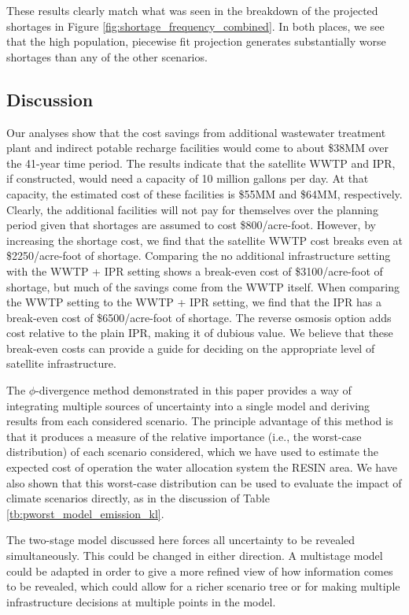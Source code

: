 \documentclass[11pt]{article}
\theoremstyle{plain}
\theoremstyle{definition}
\theoremstyle{remark}
\begin{document}
These results clearly match what was seen in the breakdown of the projected shortages in Figure \ref{fig:shortage_frequency_combined}.
In both places, we see that the high population, piecewise fit projection generates substantially worse shortages than any of the other scenarios.


\subsection{Discussion}

Our analyses show that the cost savings from additional wastewater treatment plant and indirect potable recharge facilities would come to about \$38MM over the 41-year time period.
The results indicate that the satellite WWTP and IPR, if constructed, would need a capacity of 10 million gallons per day.
At that capacity, the estimated cost of these facilities is \$55MM and \$64MM, respectively.
Clearly, the additional facilities will not pay for themselves over the planning period given that shortages are assumed to cost \$800/acre-foot.
However, by increasing the shortage cost, we find that the satellite WWTP cost breaks even at \$2250/acre-foot of shortage.
Comparing the no additional infrastructure setting with the WWTP + IPR setting shows a break-even cost of \$3100/acre-foot of shortage, but much of the savings come from the WWTP itself.
When comparing the WWTP setting to the WWTP + IPR setting, we find that the IPR has a break-even cost of \$6500/acre-foot of shortage.
The reverse osmosis option adds cost relative to the plain IPR, making it of dubious value.
We believe that these break-even costs can provide a guide for deciding on the appropriate level of satellite infrastructure.

The $\phi$-divergence method demonstrated in this paper provides a way of integrating multiple sources of uncertainty into a single model and deriving results from each considered scenario.
The principle advantage of this method is that it produces a measure of the relative importance (i.e., the worst-case distribution) of each scenario considered, which we have used to estimate the expected cost of operation the water allocation system the RESIN area.
We have also shown that this worst-case distribution can be used to evaluate the impact of climate scenarios directly, as in the discussion of Table \ref{tb:pworst_model_emission_kl}.

The two-stage model discussed here forces all uncertainty to be revealed simultaneously.
This could be changed in either direction.
A multistage model could be adapted in order to give a more refined view of how information comes to be revealed, which could allow for a richer scenario tree or for making multiple infrastructure decisions at multiple points in the model.
\end{document}
